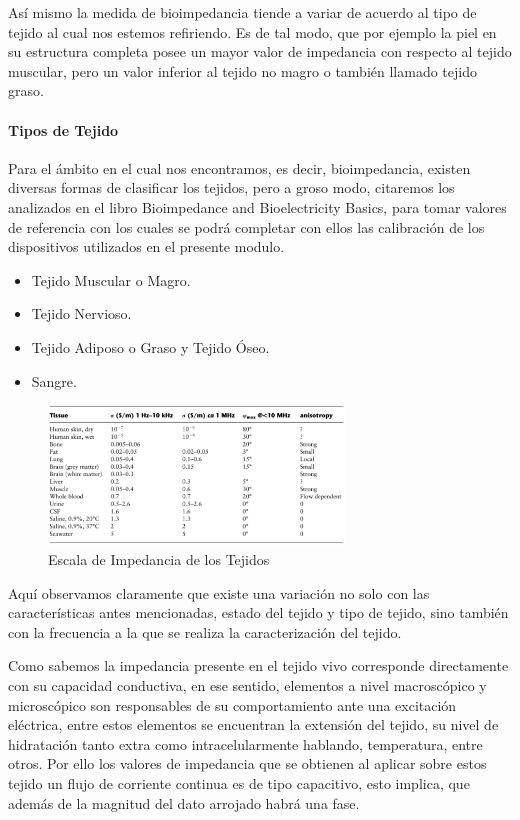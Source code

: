 \documentclass[12pt,letterpaper,spanish]{article}
\begin{document}
				Así mismo la medida de bioimpedancia tiende a variar de acuerdo al tipo de tejido al cual nos estemos refiriendo. Es de tal modo, que por ejemplo la piel en su estructura completa posee un mayor valor de impedancia con respecto al tejido muscular, pero un valor inferior al tejido no magro o también llamado tejido graso.
				\paragraph{Tipos de Tejido}
				\hfill\break
				Para el ámbito en el cual nos encontramos, es decir, bioimpedancia, existen diversas formas de clasificar los tejidos, pero a groso modo, citaremos los analizados en el libro Bioimpedance and Bioelectricity Basics, para tomar valores de referencia con los cuales se podrá completar con ellos las calibración de los dispositivos utilizados en el presente modulo.
			
				\begin{itemize}
					\item Tejido Muscular o Magro.
					\item Tejido Nervioso.
				 	\item Tejido Adiposo o Graso y Tejido Óseo.
					\item Sangre.
				\end{itemize}
			
				\begin{figure}[H]
					\centering
					\includegraphics[width=0.7\textwidth]{./Imagenes/Imp_Tejido.png}
					\caption{Escala de Impedancia de los Tejidos}
				\end{figure}
			
				Aquí observamos claramente que existe una variación no solo con las características antes mencionadas, estado del tejido y tipo de tejido, sino también con la frecuencia a la que se realiza la caracterización del tejido. 
			
				Como sabemos la impedancia presente en el tejido vivo corresponde directamente con su capacidad conductiva, en ese sentido, elementos a nivel macroscópico y microscópico son responsables de su comportamiento ante una excitación eléctrica, entre estos elementos se encuentran la extensión del tejido, su nivel de hidratación tanto extra como intracelularmente hablando, temperatura, entre otros. Por ello los valores de impedancia que se obtienen al aplicar sobre estos tejido un flujo de corriente continua es de tipo capacitivo, esto implica, que además de la magnitud del dato arrojado habrá una fase.
\end{document}
